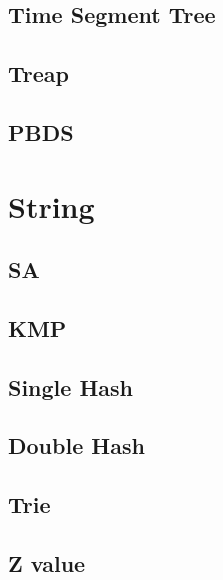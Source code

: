 \subsection{Time Segment Tree}


\subsection{Treap}


\subsection{PBDS}


\section{String}

\subsection{SA}


\subsection{KMP}


\subsection{Single Hash}


\subsection{Double Hash}


\subsection{Trie}


\subsection{Z value}



